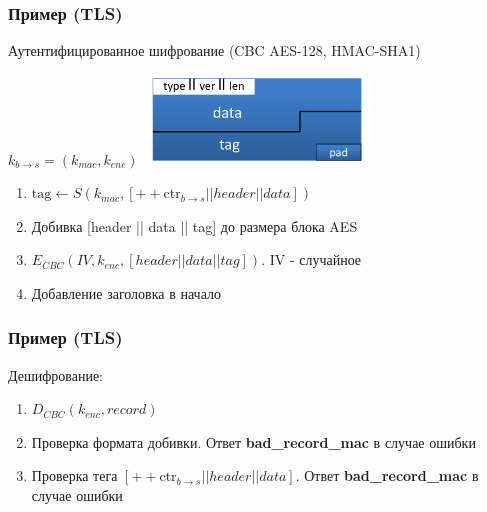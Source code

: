 \documentclass{beamer}
\begin{document}
\begin{frame}
  \frametitle{Пример (TLS)}

  Аутентифицированное шифрование (CBC AES-128, HMAC-SHA1)

  $k_{b \rightarrow s} = (k_{mac}, k_{enc})$ \includegraphics[width=60mm]{./img/png/TLS_record.png}

  \begin{enumerate}
    \item{$ \text{tag} \leftarrow S(k_{mac}, [++\text{ctr}_{b \rightarrow s} || header || data])$}
    \item{Добивка [header || data || tag] до размера блока AES}
    \item{$E_{CBC} (IV, k_{enc}, [header || data || tag])$. IV - случайное }
    \item{Добавление заголовка в начало}
  \end{enumerate}
\end{frame}

\begin{frame}
  \frametitle{Пример (TLS)}

  Дешифрование:

  \begin{enumerate}
    \item{$D_{CBC}(k_{enc},record)$}
    \item{Проверка формата добивки. Ответ \textbf{bad\_record\_mac} в случае ошибки}
    \item{Проверка тега $[++\text{ctr}_{b \rightarrow s} || header || data ]$. Ответ \textbf{bad\_record\_mac} в случае ошибки}
  \end{enumerate}
\end{frame}
\end{document}
